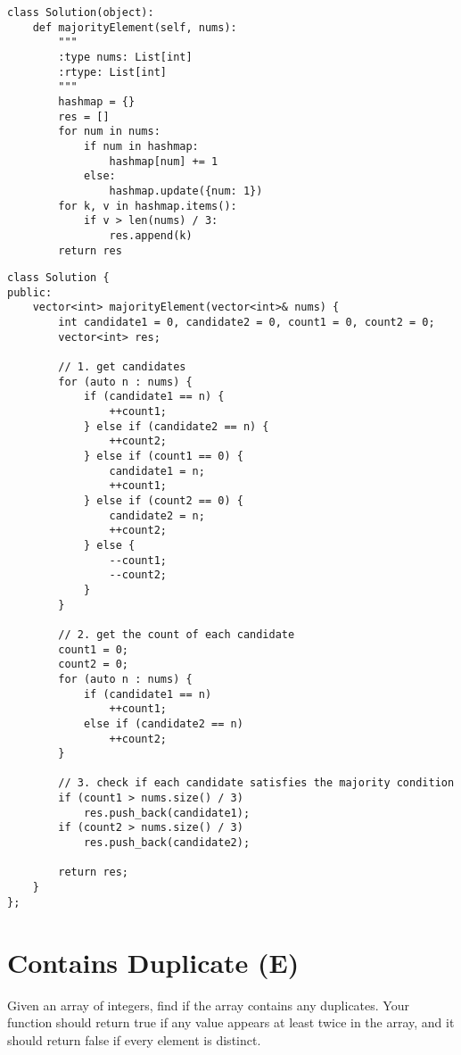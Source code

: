 \begin{lstlisting}
class Solution(object):
    def majorityElement(self, nums):
        """
        :type nums: List[int]
        :rtype: List[int]
        """
        hashmap = {}
        res = []
        for num in nums:
            if num in hashmap:
                hashmap[num] += 1
            else:
                hashmap.update({num: 1})
        for k, v in hashmap.items():
            if v > len(nums) / 3:
                res.append(k)
        return res
\end{lstlisting}

\begin{lstlisting}
class Solution {
public:
    vector<int> majorityElement(vector<int>& nums) {
        int candidate1 = 0, candidate2 = 0, count1 = 0, count2 = 0;
        vector<int> res;
        
        // 1. get candidates
        for (auto n : nums) {
            if (candidate1 == n) {
                ++count1;
            } else if (candidate2 == n) {
                ++count2;
            } else if (count1 == 0) {
                candidate1 = n;
                ++count1;
            } else if (count2 == 0) {
                candidate2 = n;
                ++count2;
            } else {
                --count1;
                --count2;
            }
        }
        
        // 2. get the count of each candidate
        count1 = 0;
        count2 = 0;
        for (auto n : nums) {
            if (candidate1 == n)
                ++count1;
            else if (candidate2 == n)
                ++count2;
        }
        
        // 3. check if each candidate satisfies the majority condition
        if (count1 > nums.size() / 3)
            res.push_back(candidate1);
        if (count2 > nums.size() / 3)
            res.push_back(candidate2);
            
        return res;
    }
};
\end{lstlisting}


\section{Contains Duplicate (E)}
Given an array of integers, find if the array contains any duplicates. Your function should return true if any value appears at least twice in the array, and it should return false if every element is distinct. \\

